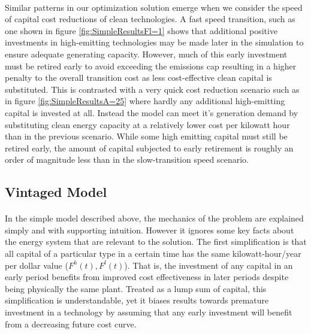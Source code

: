 \documentclass{article}
\begin{document}
\paragraph{} Similar patterns in our optimization solution emerge when we consider the speed of capital cost reductions of clean technologies. A fast speed transition, such as one shown in figure \ref{fig:SimpleResultsFl=1} shows that additional positive investments in high-emitting technologies may be made later in the simulation to ensure adequate generating capacity. However, much of this early investment must be retired early to avoid exceeding the emissions cap resulting in a higher penalty to the overall transition cost as less cost-effective clean capital is substituted. This is contrasted with a very quick cost reduction scenario such as in figure \ref{fig:SimpleResultsA=25} where hardly any additional high-emitting capital is invested at all. Instead the model can meet it's generation demand by substituting clean energy capacity at a relatively lower cost per kilowatt hour than in the previous scenario. While some high emitting capital must still be retired early, the amount of capital subjected to early retirement is roughly an order of magnitude less than in the slow-transition speed scenario. 



\FloatBarrier

\subsection{Vintaged Model}\label{VintExplan}

\paragraph{} In the simple model described above, the mechanics of the problem are explained simply and with supporting intuition. However it ignores some key facts about the energy system that are relevant to the solution. The first simplification is that all capital of a particular type in a certain time has the same kilowatt-hour/year per dollar value ($F^h(t), F^l(t)$). That is, the investment of any capital in an early period benefits from improved cost effectiveness in later periods despite being physically the same plant. Treated as a lump sum of capital, this simplification is understandable, yet it biases results towards premature investment in a technology by assuming that any early investment will benefit from a decreasing future cost curve. 
\end{document}
